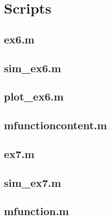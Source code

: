 \section*{Scripts}
    \subsection*{ex6.m}
    \label{subsec:ex6}
    

    \subsection*{sim\_ex6.m}
    \label{subsec:simex6}
    

    \subsection*{plot\_ex6.m}
    \label{subsec:plotex6}
    
    
    \subsection*{mfunctioncontent.m}
    \label{subsec:mfunctionex6}
    
    
    \subsection*{ex7.m}
    \label{subsec:ex7}
    
    
    \subsection*{sim\_ex7.m}
    \label{subsec:simex7}
    
    
    \subsection*{mfunction.m}
    \label{subsec:mfunctionex7}
    
    
